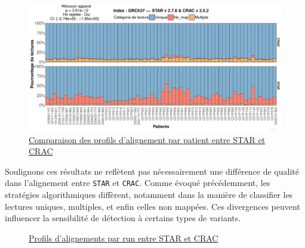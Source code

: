 \begin{figure}[H]
\begin{flushleft}
\includegraphics[width=1\linewidth]{Figure_STAR_CRAC_P.pdf}
\caption{\underline{Comparaison des profils d'alignement par patient entre STAR et CRAC}}
\label{fig:mappingp}
\end{flushleft}
\end{figure}

Soulignons ces résultats ne reflètent pas nécessairement une différence de qualité dans l’alignement entre \texttt{STAR} et \texttt{CRAC}. Comme évoqué précédemment, les stratégies algorithmiques diffèrent, notamment dans la manière de classifier les lectures uniques, multiples, et enfin celles non mappées. Ces divergences peuvent influencer la sensibilité de détection à certains types de variants.

\begin{figure}[H]
\begin{center}
    \caption{\underline{Profils d'alignements par run entre STAR et CRAC}}
    \label{fig:mappingr}
\end{center}
\end{figure}

